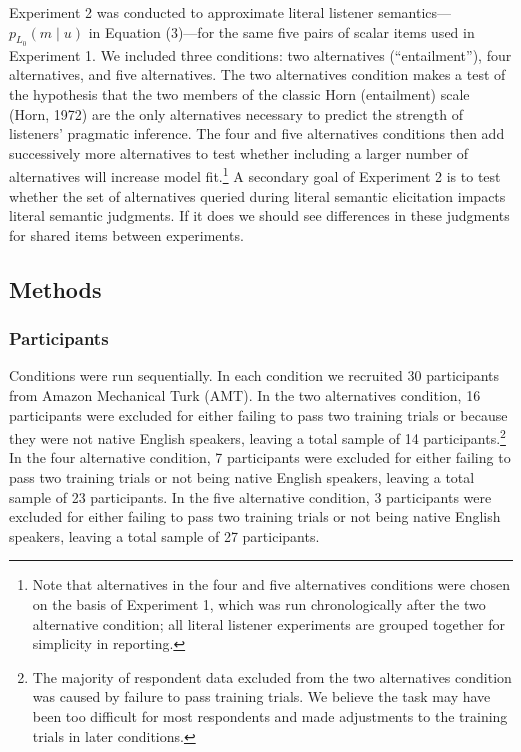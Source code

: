 \documentclass[10pt, letterpaper]{article}
\begin{document}
Experiment 2 was conducted to approximate literal listener
semantics---\(p_{L_0}(m \mid u)\) in Equation (3)---for the same five
pairs of scalar items used in Experiment 1. We included three
conditions: two alternatives (``entailment''), four alternatives, and
five alternatives. The two alternatives condition makes a test of the
hypothesis that the two members of the classic Horn (entailment) scale
(Horn, 1972) are the only alternatives necessary to predict the strength
of listeners' pragmatic inference. The four and five alternatives
conditions then add successively more alternatives to test whether
including a larger number of alternatives will increase model
fit.\footnote{Note that alternatives in the four and five alternatives conditions were chosen on the basis of Experiment 1, which was run chronologically after the two alternative condition; all literal listener experiments are grouped together for simplicity in reporting.}
A secondary goal of Experiment 2 is to test whether the set of
alternatives queried during literal semantic elicitation impacts literal
semantic judgments. If it does we should see differences in these
judgments for shared items between experiments.

\subsection{Methods}\label{methods-1}

\subsubsection{Participants}\label{participants-1}

Conditions were run sequentially. In each condition we recruited 30
participants from Amazon Mechanical Turk (AMT). In the two alternatives
condition, 16 participants were excluded for either failing to pass two
training trials or because they were not native English speakers,
leaving a total sample of 14
participants.\footnote{The majority of respondent data excluded from the two alternatives condition was caused by failure to pass training trials. We believe the task may have been too difficult for most respondents and made adjustments to the training trials in later conditions.}
In the four alternative condition, 7 participants were excluded for
either failing to pass two training trials or not being native English
speakers, leaving a total sample of 23 participants. In the five
alternative condition, 3 participants were excluded for either failing
to pass two training trials or not being native English speakers,
leaving a total sample of 27 participants.
\end{document}
